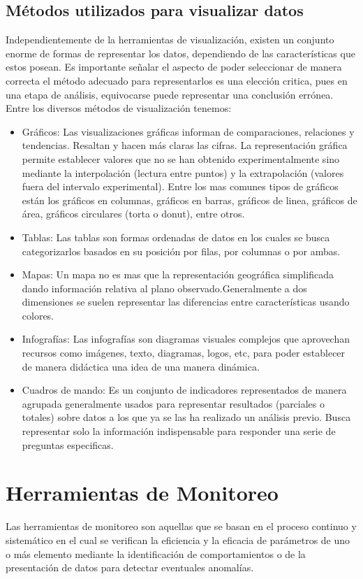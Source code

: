 \subsection{Métodos utilizados para visualizar datos}
Independientemente de la herramientas de visualización, existen un conjunto enorme de formas de representar los datos, dependiendo de las características que estos posean. Es importante señalar el aspecto de poder seleccionar de manera correcta el método adecuado para representarlos es una elección critica, pues en una etapa de análisis, equivocarse puede representar una conclusión errónea.\\

Entre los diversos métodos de visualización tenemos:
\begin{itemize}
\item Gráficos: Las visualizaciones gráficas informan de comparaciones, relaciones y tendencias. Resaltan y hacen más claras las cifras.\cite{ibmviz} La representación gráfica permite establecer valores que no se han obtenido experimentalmente sino mediante la interpolación (lectura entre puntos) y la extrapolación (valores fuera del intervalo experimental). Entre los mas comunes tipos de gráficos están los gráficos en columnas, gráficos en barras, gráficos de linea, gráficos de área, gráficos circulares (torta o donut), entre otros.  
\item Tablas: Las tablas son formas ordenadas de datos en los cuales se busca categorizarlos basados en su posición por filas, por columnas o por ambas.
\item Mapas: Un mapa no es mas que la representación geográfica simplificada dando información relativa al plano observado.Generalmente a dos dimensiones se suelen representar las diferencias entre características usando colores.
\item Infografías: Las infografías son diagramas visuales complejos que aprovechan recursos como imágenes, texto, diagramas, logos, etc, para poder establecer de manera didáctica una idea de una manera dinámica.\
\item Cuadros de mando: Es un conjunto de indicadores representados de manera agrupada generalmente usados para representar resultados (parciales o totales) sobre datos a los que ya se las ha realizado un análisis previo. Busca representar solo la información indispensable para responder una serie de preguntas especificas.   
\end{itemize}


\section{Herramientas de Monitoreo}
Las herramientas de monitoreo son aquellas que se basan en el proceso continuo y sistemático en el cual se verifican la eficiencia y la eficacia de parámetros de uno o más elemento mediante la identificación de comportamientos o de la presentación de datos para detectar eventuales anomalías.\\

